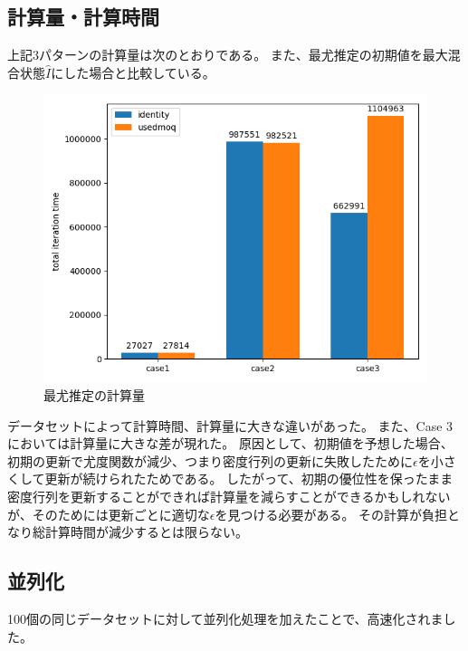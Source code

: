 \documentclass[11pt,a4j,notitlepage]{jreport}
\begin{document}
	\newpage

	\subsection*{計算量・計算時間}

	上記3パターンの計算量は次のとおりである。
	また、最尤推定の初期値を最大混合状態$\hat{I}$にした場合と比較している。

	\begin{figure}[htbp]
		\centering
			\includegraphics[clip,width=12.0cm]{./picture/cg.png}
			\caption{最尤推定の計算量}
	\end{figure}

	データセットによって計算時間、計算量に大きな違いがあった。
	また、Case 3においては計算量に大きな差が現れた。
	原因として、初期値を予想した場合、初期の更新で尤度関数が減少、つまり密度行列の更新に失敗したために$\epsilon$を小さくして更新が続けられたためである。
	したがって、初期の優位性を保ったまま密度行列を更新することができれば計算量を減らすことができるかもしれないが、そのためには更新ごとに適切な$\epsilon$を見つける必要がある。
	その計算が負担となり総計算時間が減少するとは限らない。

	\newpage

	\subsection*{並列化}

	100個の同じデータセットに対して並列化処理を加えたことで、高速化されました。
\end{document}
